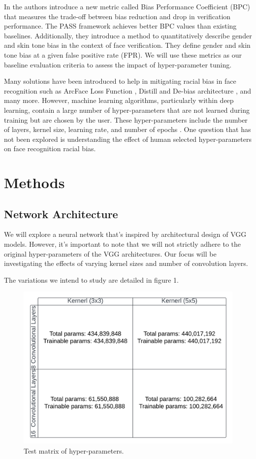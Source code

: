 \documentclass[conference]{IEEEtran}
\begin{document}
In \cite{dhar2021pass} the authors introduce a new metric called Bias Performance Coefficient (BPC) that measures the trade-off between bias reduction and drop in verification performance. The PASS framework achieves better BPC values than existing baselines. Additionally, they introduce a method to quantitatively describe gender and skin tone bias in the context of face verification. They define gender and skin tone bias at a given false positive rate (FPR). We will use these metrics as our baseline evaluation criteria to assess the impact of hyper-parameter tuning.

Many solutions have been introduced to help in mitigating racial bias in face recognition such as ArcFace Loss Function \cite{deng2019arcface}, Distill and De-bias architecture \cite{dhar2021pass}, and many more. However, machine learning algorithms, particularly within deep learning, contain a large number of hyper-parameters that are not learned during training but are chosen by the user. These hyper-parameters include the number of layers, kernel size, learning rate, and number of epochs \cite{hellstrom2020bias}. One question that has not been explored is understanding the effect of human selected hyper-parameters on face recognition racial bias.


\section{Methods}
\subsection{Network Architecture}
We will explore a neural network that’s inspired by architectural design of VGG models. However, it’s important to note that we will not strictly adhere to the original hyper-parameters of the VGG architectures. Our focus will be investigating the effects of varying kernel sizes and number of convolution layers. 

The variations we intend to study are detailed in figure 1.
\begin{figure}[htbp]
    \centerline{\includegraphics[width=1\linewidth]{latex/images/Matrix.png}}
    \caption{Test matrix of hyper-parameters.}
    \label{test_matrix}
\end{figure}
\end{document}
